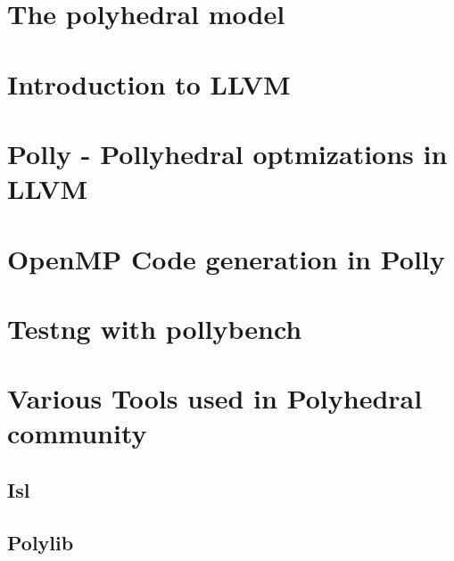 \documentclass[MTech]{iitmdiss}
\begin{document}
 \chapter{The polyhedral model}


 \chapter{Introduction to LLVM}


\chapter{Polly - Pollyhedral optmizations in LLVM}


\chapter{OpenMP Code generation in Polly}


\chapter{Testng with pollybench}


%




\appendix
 
\chapter{Various Tools used in Polyhedral community}
\section{Isl}
\section{Polylib}
\end{document}
